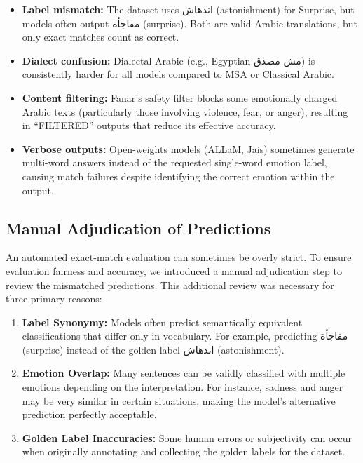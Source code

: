 \begin{itemize}
    \item \textbf{Label mismatch:} The dataset uses \textarabic{اندهاش} (astonishment) for Surprise, but models often output \textarabic{مفاجأة} (surprise). Both are valid Arabic translations, but only exact matches count as correct.

    \item \textbf{Dialect confusion:} Dialectal Arabic (e.g., Egyptian \textarabic{مش مصدق}) is consistently harder for all models compared to MSA or Classical Arabic.

    \item \textbf{Content filtering:} Fanar's safety filter blocks some emotionally charged Arabic texts (particularly those involving violence, fear, or anger), resulting in ``FILTERED'' outputs that reduce its effective accuracy.

    \item \textbf{Verbose outputs:} Open-weights models (ALLaM, Jais) sometimes generate multi-word answers instead of the requested single-word emotion label, causing match failures despite identifying the correct emotion within the output.
\end{itemize}

\subsection{Manual Adjudication of Predictions}

An automated exact-match evaluation can sometimes be overly strict. To ensure evaluation fairness and accuracy, we introduced a manual adjudication step to review the mismatched predictions. This additional review was necessary for three primary reasons:

\begin{enumerate}
    \item \textbf{Label Synonymy:} Models often predict semantically equivalent classifications that differ only in vocabulary. For example, predicting \textarabic{مفاجأة} (surprise) instead of the golden label \textarabic{اندهاش} (astonishment).
    \item \textbf{Emotion Overlap:} Many sentences can be validly classified with multiple emotions depending on the interpretation. For instance, sadness and anger may be very similar in certain situations, making the model's alternative prediction perfectly acceptable.
    \item \textbf{Golden Label Inaccuracies:} Some human errors or subjectivity can occur when originally annotating and collecting the golden labels for the dataset.
\end{enumerate}

